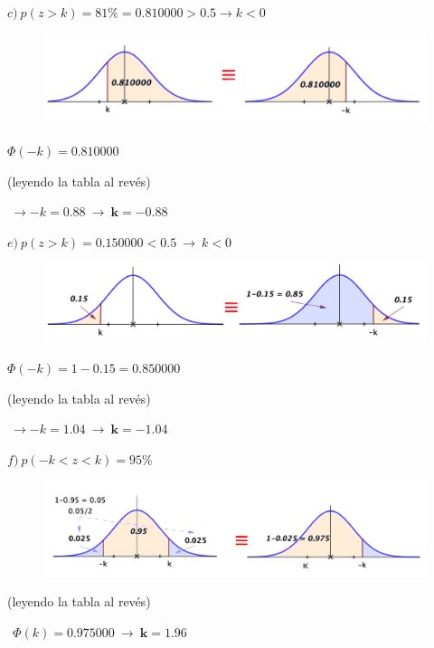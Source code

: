 \begin{ejemplo}
\begin{ejre}
\vspace{5mm}
$c)\ p(z>k)=81\%=0.810000>0.5 \to k<0$

	\begin{figure}[H]
	\centering
	\includegraphics[width=.8\textwidth]{imagenes/imagenes04/T04IM27.png}
	\end{figure}

$\Phi(-k)= 0.810000 \ $ 
\begin{small} \textcolor{gris}{(leyendo la tabla al revés)} \end{small}
$\ \to -k=0.88 \ \to \ \boldsymbol{k=-0.88}$

\vspace{5mm}
$e)\ p(z>k)=0.150000 <0.5 \ \to \ k<0$

	\begin{figure}[H]
	\centering
	\includegraphics[width=.8\textwidth]{imagenes/imagenes04/T04IM28.png}
	\end{figure}
	
$\Phi(-k)=1-0.15=0.850000\ $
\begin{small} \textcolor{gris}{(leyendo la tabla al revés)} \end{small}
$\ \to -k=1.04 \ \to \ \boldsymbol{k=-1.04}$


\vspace{5mm}
$f)\ p(-k<z<k)=95\%$

	\begin{figure}[H]
	\centering
	\includegraphics[width=.8\textwidth]{imagenes/imagenes04/T04IM29.png}
	\end{figure}
	
\begin{small} \textcolor{gris}{(leyendo la tabla al revés)} \end{small} $\ \ \Phi(k)=0.975000 \ \to \ \boldsymbol{k=1.96}$

\end{ejre}
\end{ejemplo}


